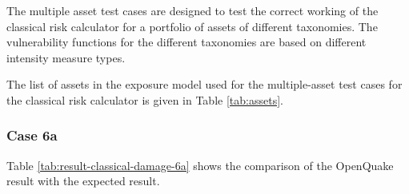 The multiple asset test cases are designed to test the correct working of the classical risk calculator for a portfolio of assets of different taxonomies. The vulnerability functions for the different taxonomies are based on different intensity measure types.

The list of assets in the exposure model used for the multiple-asset test cases for the classical risk calculator is given in Table \ref{tab:assets}.

\subsubsection{Case 6a}




Table \ref{tab:result-classical-damage-6a} shows the comparison of the OpenQuake result with the expected result.